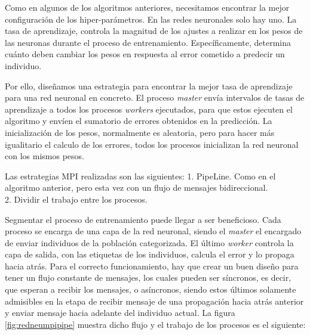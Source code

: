 	
	Como en algunos de los algoritmos anteriores, necesitamos encontrar la mejor configuración de los hiper-parámetros. En las redes neuronales solo hay uno. La tasa de aprendizaje, controla la magnitud de los ajustes a realizar en los pesos de las neuronas durante el proceso de entrenamiento. Específicamente, determina cuánto deben cambiar los pesos en respuesta al error cometido a predecir un individuo.
	
	
	Por ello, diseñamos una estrategia para encontrar la mejor tasa de aprendizaje para una red neuronal en concreto. El proceso \textit{master} envía intervalos de tasas de aprendizaje a todos los procesos \textit{workers} ejecutados, para que estos ejecuten el algoritmo y envíen el sumatorio de errores obtenidos en la predicción. La inicialización de los pesos, normalmente es aleatoria, pero para hacer más igualitario el calculo de los errores, todos los procesos inicializan la red neuronal con los mismos pesos.
	
	
	
	\begin{flushleft}		
		Las estrategias MPI realizadas son las siguientes:
		1. PipeLine. Como en el algoritmo anterior, pero esta vez con un flujo de mensajes bidireccional.\\
		2. Dividir el trabajo entre los procesos.
	\end{flushleft}
	
	Segmentar el proceso de entrenamiento puede llegar a ser beneficioso. Cada proceso se encarga de una capa de la red neuronal, siendo el \textit{master} el encargado de enviar individuos de la población categorizada. El último \textit{worker} controla la capa de salida, con las etiquetas de los individuos, calcula el error y lo propaga hacia atrás. Para el correcto funcionamiento, hay que crear un buen diseño para tener un flujo constante de mensajes, los cuales pueden ser síncronos, es decir, que esperan a recibir los mensajes, o asíncronos, siendo estos últimos solamente admisibles en la etapa de recibir mensaje de una propagación hacia atrás anterior y enviar mensaje hacia adelante del individuo actual. La figura \ref{fig:redneumpipipe} muestra dicho flujo y el trabajo de los procesos es el siguiente:	
	
